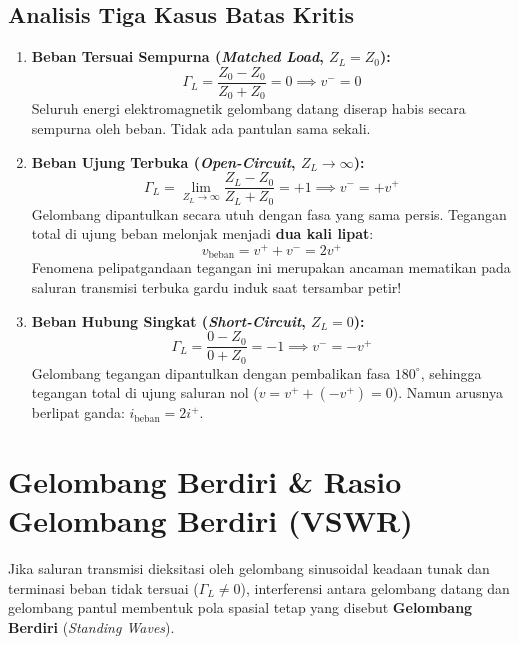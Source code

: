 \documentclass[11pt,a4paper]{article}
\theoremstyle{definition}
\begin{document}
\subsection{Analisis Tiga Kasus Batas Kritis}
\begin{enumerate}[leftmargin=*]
    \item \textbf{Beban Tersuai Sempurna (\textit{Matched Load}, $Z_L = Z_0$):}
    \begin{equation*}
        \Gamma_L = \frac{Z_0 - Z_0}{Z_0 + Z_0} = 0 \implies v^- = 0
    \end{equation*}
    Seluruh energi elektromagnetik gelombang datang diserap habis secara sempurna oleh beban. Tidak ada pantulan sama sekali.
    
    \item \textbf{Beban Ujung Terbuka (\textit{Open-Circuit}, $Z_L \to \infty$):}
    \begin{equation*}
        \Gamma_L = \lim_{Z_L \to \infty} \frac{Z_L - Z_0}{Z_L + Z_0} = +1 \implies v^- = +v^+
    \end{equation*}
    Gelombang dipantulkan secara utuh dengan fasa yang sama persis. Tegangan total di ujung beban melonjak menjadi \textbf{dua kali lipat}:
    \begin{equation}
        v_{\text{beban}} = v^+ + v^- = 2 v^+
    \end{equation}
    Fenomena pelipatgandaan tegangan ini merupakan ancaman mematikan pada saluran transmisi terbuka gardu induk saat tersambar petir!
    
    \item \textbf{Beban Hubung Singkat (\textit{Short-Circuit}, $Z_L = 0$):}
    \begin{equation*}
        \Gamma_L = \frac{0 - Z_0}{0 + Z_0} = -1 \implies v^- = -v^+
    \end{equation*}
    Gelombang tegangan dipantulkan dengan pembalikan fasa $180^\circ$, sehingga tegangan total di ujung saluran nol ($v = v^+ + (-v^+) = 0$). Namun arusnya berlipat ganda: $i_{\text{beban}} = 2 i^+$.
\end{enumerate}

\section{Gelombang Berdiri \& Rasio Gelombang Berdiri (VSWR)}

Jika saluran transmisi dieksitasi oleh gelombang sinusoidal keadaan tunak dan terminasi beban tidak tersuai ($\Gamma_L \ne 0$), interferensi antara gelombang datang dan gelombang pantul membentuk pola spasial tetap yang disebut \textbf{Gelombang Berdiri} (\textit{Standing Waves}).
\end{document}
